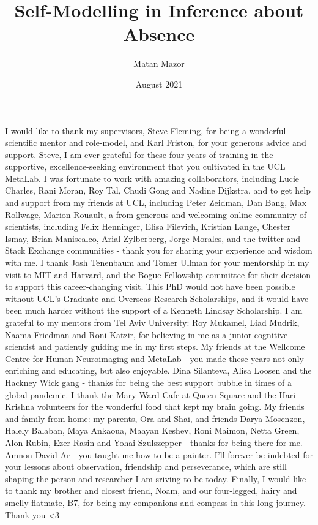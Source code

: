 \documentclass[12pt,twoside]{reedthesis}
\title{Self-Modelling in Inference about Absence}
\author{Matan Mazor}
\date{August 2021}
\begin{document}
  \maketitle

\frontmatter %
\pagestyle{empty} %
  \begin{acknowledgements}
    I would like to thank my supervisors, Steve Fleming, for being a wonderful scientific mentor and role-model, and Karl Friston, for your generous advice and support. Steve, I am ever grateful for these four years of training in the supportive, excellence-seeking environment that you cultivated in the UCL MetaLab. I was fortunate to work with amazing collaborators, including Lucie Charles, Rani Moran, Roy Tal, Chudi Gong and Nadine Dijkstra, and to get help and support from my friends at UCL, including Peter Zeidman, Dan Bang, Max Rollwage, Marion Rouault, a from generous and welcoming online community of scientists, including Felix Henninger, Elisa Filevich, Kristian Lange, Chester Ismay, Brian Maniscalco, Arial Zylberberg, Jorge Morales, and the twitter and Stack Exchange communities - thank you for sharing your experience and wisdom with me. I thank Josh Tenenbaum and Tomer Ullman for your mentorship in my visit to MIT and Harvard, and the Bogue Fellowship committee for their decision to support this career-changing visit. This PhD would not have been possible without UCL's Graduate and Overseas Research Scholarships, and it would have been much harder without the support of a Kenneth Lindsay Scholarship. I am grateful to my mentors from Tel Aviv University: Roy Mukamel, Liad Mudrik, Naama Friedman and Roni Katzir, for believing in me as a junior cognitive scientist and patiently guiding me in my first steps. My friends at the Wellcome Centre for Human Neuroimaging and MetaLab - you made these years not only enriching and educating, but also enjoyable. Dina Silanteva, Alisa Loosen and the Hackney Wick gang - thanks for being the best support bubble in times of a global pandemic. I thank the Mary Ward Cafe at Queen Square and the Hari Krishna volunteers for the wonderful food that kept my brain going. My friends and family from home: my parents, Ora and Shai, and friends Darya Mosenzon, Halely Balaban, Maya Ankaoua, Maayan Keshev, Roni Maimon, Netta Green, Alon Rubin, Ezer Rasin and Yohai Szulszepper - thanks for being there for me. Amnon David Ar - you taught me how to be a painter. I'll forever be indebted for your lessons about observation, friendship and perseverance, which are still shaping the person and researcher I am sriving to be today. Finally, I would like to thank my brother and closest friend, Noam, and our four-legged, hairy and smelly flatmate, B7, for being my companions and compass in this long journey. Thank you \textless3
  \end{acknowledgements}
\end{document}
